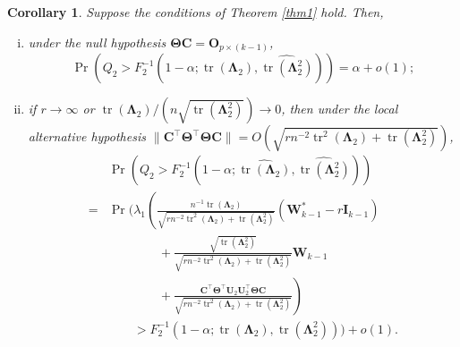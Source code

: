\documentclass[12pt]{article} %
\DeclareMathOperator{\mytr}{tr}
\newcommand{\bC}{\mathbf{C}}
\newcommand{\bO}{\mathbf{O}}
\newcommand{\bI}{\mathbf{I}}
\newcommand{\bU}{\mathbf{U}}
\newcommand{\bW}{\mathbf{W}}
\newcommand{\bfsym}[1]{\ensuremath{\boldsymbol{#1}}}
\def\bLambda {\bfsym {\Lambda}}
\def\bTheta {\bfsym {\Theta}}
\newtheorem{corollary}{Corollary}
\theoremstyle{definition}
\begin{document}
\begin{corollary}
    Suppose the conditions of Theorem \ref{thm1} hold.
    Then,
    \begin{enumerate}[(i)]
        \item 
            under the null hypothesis $\bTheta \bC=\bO_{p\times (k-1)}$,
\begin{equation*}
    \Pr
    \left(
        Q_2
    >
    F_2^{-1}\left(1-\alpha;\widehat{\mytr(\bLambda_2)},\widehat{\mytr(\bLambda_2^2)}\right)
\right)=\alpha +o(1)
        ;
\end{equation*}
        \item
            if $r\to \infty$ or $\mytr(\bLambda_2)/(n \sqrt{\mytr(\bLambda_2^2)})\to 0$, then under the local alternative hypothesis $\|\bC^\top \bTheta^\top \bTheta \bC\|=O(\sqrt{
        rn^{-2} \mytr^2 (\bLambda_2) + \mytr(\bLambda_2^2)
            })$,
\begin{equation*}
\begin{split}
    &\Pr
    \left(
        Q_2
    >
    F_2^{-1}\left(1-\alpha;\widehat{\mytr(\bLambda_2)},\widehat{\mytr(\bLambda_2^2)}\right)
\right)
\\
=
    &\Pr
    \Bigg(
\lambda_1
\left(
\frac{
    n^{-1} \mytr(\bLambda_2)
}{
    \sqrt{
        rn^{-2} \mytr^2 (\bLambda_2) + \mytr(\bLambda_2^2)
    }
}
(\bW_{k-1}^* - r\bI_{k-1})
\right.
\\
&\quad\quad\quad\quad+
\frac{
    \sqrt{\mytr(\bLambda_2^2)}
}{
    \sqrt{
        rn^{-2} \mytr^2 (\bLambda_2) + \mytr(\bLambda_2^2)
    }
}
\bW_{k-1}
\\
&\left.
\quad\quad\quad\quad
+
\frac{
    \bC^\top \bTheta^\top \bU_2 \bU_2^\top \bTheta \bC
}{
    \sqrt{
        rn^{-2} \mytr^2 (\bLambda_2) + \mytr(\bLambda_2^2)
    }
}
\right)
\\
    &\quad\quad>
    F_2^{-1}\left(1-\alpha;\mytr(\bLambda_2),\mytr(\bLambda_2^2)\right)
\Bigg)
+o(1)
.
\end{split}
\end{equation*}
    \end{enumerate}
    \label{kuCor2}
\end{corollary}
\end{document}
